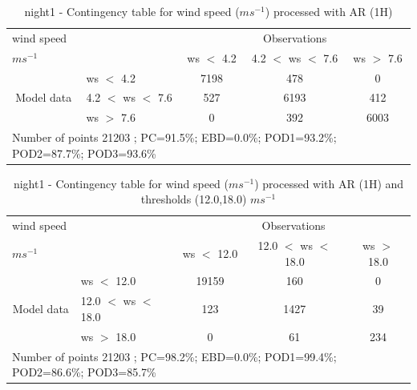 \begin{table}[h!]
\begin{center}
\begin{tabular}{llccc}
\hline
{wind speed}                                       &                                                    & \multicolumn{3}{c}{Observations}                 \\
{$m s^{-1}$}                                       &                             & ws $<$ 4.2   & 4.2 $<$ ws $<$ 7.6 & ws $>$ 7.6 \\
\hline
\multicolumn{1}{c}{\multirow{3}{*}{Model data}}  & ws $<$ 4.2             & 7198                & 478                       & 0              \\
                                                 & 4.2  $<$ ws $<$ 7.6 & 527                & 6193                       & 412              \\
                                                 & ws $>$ 7.6             & 0                & 392                       & 6003              \\
\hline 
\multicolumn{5}{l}{ Number of points        21203 ; PC=91.5\%; EBD=0.0\%; POD1=93.2\%; POD2=87.7\%; POD3=93.6\%}                 \\
\end{tabular}
\end{center}
\caption{night1 - Contingency table for  wind speed ($m s^{-1}$) processed with AR (1H)}
\label{tab:contingencywsAFT:night1}
\end{table}
\begin{table}[h!]
\begin{center}
\begin{tabular}{llccc}
\hline
{wind speed}                                       &                                                    & \multicolumn{3}{c}{Observations}                 \\
{$m s^{-1}$}                                       &                             & ws $<$ 12.0   & 12.0 $<$ ws $<$ 18.0 & ws $>$ 18.0 \\
\hline
\multicolumn{1}{c}{\multirow{3}{*}{Model data}}  & ws $<$ 12.0             & 19159                & 160                       & 0              \\
                                                 & 12.0  $<$ ws $<$ 18.0 & 123                & 1427                       & 39              \\
                                                 & ws $>$ 18.0             & 0                & 61                       & 234              \\
\hline 
\multicolumn{5}{l}{ Number of points        21203 ; PC=98.2\%; EBD=0.0\%; POD1=99.4\%; POD2=86.6\%; POD3=85.7\%}                 \\
\end{tabular}
\end{center}
\caption{night1 - Contingency table for  wind speed ($m s^{-1}$) processed with AR (1H) and thresholds (12.0,18.0) $m s^{-1}$}
\label{tab:contingencywsAFT:night1}
\end{table}
